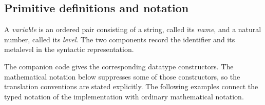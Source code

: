 \restoregeometry
\subsection{Primitive definitions and notation}
\begin{definition}[variable]
A \textit{variable} is an ordered pair consisting of a string, called its \textit{name}, and a natural number, called its \textit{level}. The two components record the identifier and its metalevel in the syntactic representation.
\end{definition}
The companion code gives the corresponding datatype constructors. The mathematical notation below suppresses some of those constructors, so the translation conventions are stated explicitly. %
The following examples connect the typed notation of the implementation with ordinary mathematical notation.

